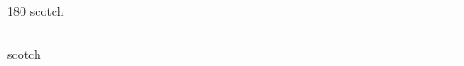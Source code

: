 
\begin{frame}
\begin{center}
\begin{turn}{180}
{\fontsize{2.5cm}{1em}\selectfont scotch}
\end{turn}
\vspace{1em}\par  
\hrule
\vspace{1em}\par  
{\fontsize{2.5cm}{1em}\selectfont scotch}
\end{center}
\end{frame}
